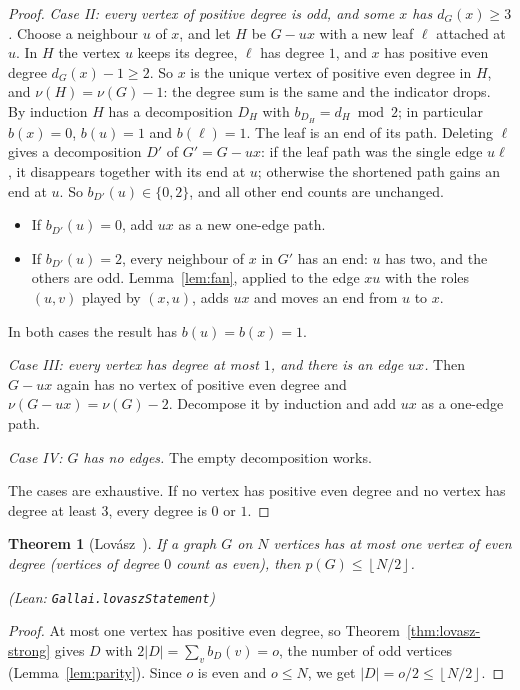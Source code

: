 \documentclass[11pt]{amsart}
\newtheorem{theorem}{Theorem}[section]
\theoremstyle{definition}
\theoremstyle{remark}
\renewcommand{\_}{\oldunderscore\allowbreak}
\newcommand{\leanst}[1]{\par{\raggedright\small\textup{(Lean: \texttt{#1})}\par}}
\newcommand{\fl}[1]{\left\lfloor #1\right\rfloor}
\begin{document}
\begin{proof}
\emph{Case II: every vertex of positive degree is odd, and some $x$ has $d_G(x)\ge3$.} Choose a
neighbour $u$ of $x$, and let $H$ be $G-ux$ with a new leaf $\ell$ attached at $u$. In $H$ the vertex
$u$ keeps its degree, $\ell$ has degree $1$, and $x$ has positive even degree $d_G(x)-1\ge2$. So $x$
is the unique vertex of positive even degree in $H$, and $\nu(H)=\nu(G)-1$: the degree sum is the
same and the indicator drops. By induction $H$ has a decomposition $D_H$ with $b_{D_H}=d_H\bmod2$;
in particular $b(x)=0$, $b(u)=1$ and $b(\ell)=1$. The leaf is an end of its path. Deleting $\ell$
gives a decomposition $D'$ of $G'=G-ux$: if the leaf path was the single edge $u\ell$, it disappears
together with its end at $u$; otherwise the shortened path gains an end at $u$. So $b_{D'}(u)\in
\{0,2\}$, and all other end counts are unchanged.
\begin{itemize}
\item If $b_{D'}(u)=0$, add $ux$ as a new one-edge path.
\item If $b_{D'}(u)=2$, every neighbour of $x$ in $G'$ has an end: $u$ has two, and the others are
odd. Lemma~\ref{lem:fan}, applied to the edge $xu$ with the roles $(u,v)$ played by $(x,u)$, adds
$ux$ and moves an end from $u$ to $x$.
\end{itemize}
In both cases the result has $b(u)=b(x)=1$.

\emph{Case III: every vertex has degree at most $1$, and there is an edge $ux$.} Then $G-ux$ again
has no vertex of positive even degree and $\nu(G-ux)=\nu(G)-2$. Decompose it by induction and add
$ux$ as a one-edge path.

\emph{Case IV: $G$ has no edges.} The empty decomposition works.

The cases are exhaustive. If no vertex has positive even degree and no vertex has degree at least
$3$, every degree is $0$ or $1$.
\end{proof}

\begin{theorem}[Lov\'asz~\cite{L68}]\label{thm:lovasz}
If a graph $G$ on $N$ vertices has at most one vertex of even degree (vertices of degree $0$ count as
even), then $p(G)\le\fl{N/2}$.
\leanst{Gallai.lovaszStatement}
\end{theorem}

\begin{proof}
At most one vertex has positive even degree, so Theorem~\ref{thm:lovasz-strong} gives $D$ with
$2|D|=\sum_v b_D(v)=o$, the number of odd vertices (Lemma~\ref{lem:parity}). Since $o$ is even and
$o\le N$, we get $|D|=o/2\le\fl{N/2}$.
\end{proof}
\end{document}
